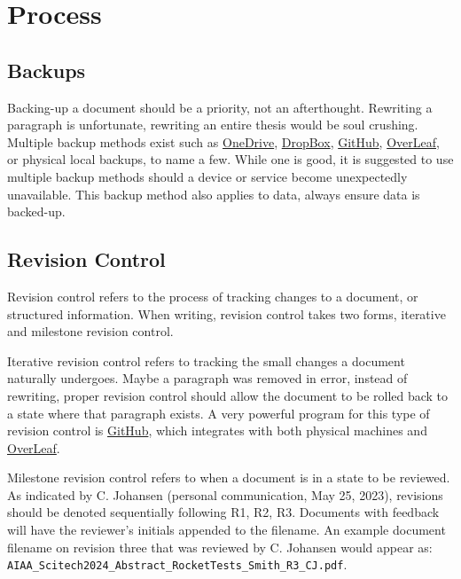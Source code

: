 \section{Process}

\subsection{Backups}
Backing-up a document should be a priority, not an afterthought. 
Rewriting a paragraph is unfortunate, rewriting an entire thesis would be soul crushing. 
Multiple backup methods exist such as \href{https://onedrive.live.com/login/}{OneDrive}, \href{https://www.dropbox.com}{DropBox}, \href{https://github.com/}{GitHub}, \href{https://www.overleaf.com/}{OverLeaf}, or physical local backups, to name a few. 
While one is good, it is suggested to use multiple backup methods should a device or service become unexpectedly unavailable. 
This backup method also applies to data, always ensure data is backed-up. 

\subsection{Revision Control}
Revision control refers to the process of tracking changes to a document, or structured information. 
When writing, revision control takes two forms, iterative and milestone revision control. 

Iterative revision control refers to tracking the small changes a document naturally undergoes. 
Maybe a paragraph was removed in error, instead of rewriting, proper revision control should allow the document to be rolled back to a state where that paragraph exists.
A very powerful program for this type of revision control is \href{https://github.com/}{GitHub}, which integrates with both physical machines and \href{https://www.overleaf.com/}{OverLeaf}.

Milestone revision control refers to when a document is in a state to be reviewed. 
As indicated by C. Johansen (personal communication, May 25, 2023), revisions should be denoted sequentially following R1, R2, R3. Documents with feedback will have the reviewer's initials appended to the filename. An example document filename on revision three that was reviewed by C. Johansen would appear as: \verb*|AIAA_Scitech2024_Abstract_RocketTests_Smith_R3_CJ.pdf|.